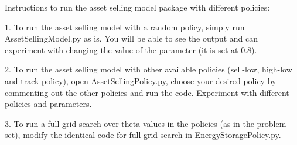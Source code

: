 Instructions to run the asset selling model package with different policies:

1. To run the asset selling model with a random policy, simply run AssetSellingModel.py as is. You will be able to see the output and can experiment with changing the value of the parameter (it is set at 0.8).

2. To run the asset selling model with other available policies (sell-low, high-low and track policy), open AssetSellingPolicy.py, choose your desired policy by commenting out the other policies and run the code. Experiment with different policies and parameters.

3. To run a full-grid search over theta values in the policies (as in the problem set), modify the identical code for full-grid search in EnergyStoragePolicy.py.